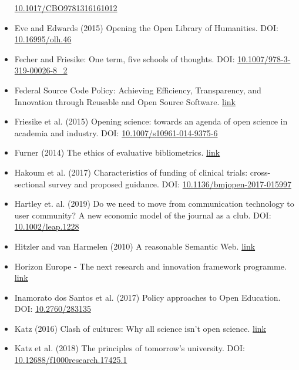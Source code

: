 \begin{itemize}
  \href{https://doi.org/10.1017/CBO9781316161012}{10.1017/CBO9781316161012}
\item
  Eve and Edwards (2015) Opening the Open Library of Humanities. DOI:
  \href{https://doi.org/10.16995/olh.46}{10.16995/olh.46}
\item
  Fecher and Friesike: One term, five schools of thoughts. DOI:
  \href{https://doi.org/10.1007/978-3-319-00026-8_2}{10.1007/978-3-319-00026-8\_2}
\item
  Federal Source Code Policy: Achieving Efficiency, Transparency, and
  Innovation through Reusable and Open Source Software.
  \href{https://sourcecode.cio.gov/}{link}
\item
  Friesike et al. (2015) Opening science: towards an agenda of open
  science in academia and industry. DOI:
  \href{https://doi.org/10.1007/s10961-014-9375-6}{10.1007/s10961-014-9375-6}
\item
  Furner (2014) The ethics of evaluative bibliometrics.
  \href{http://www.jonathanfurner.info/docs/furnerInPress-a.pdf}{link}
\item
  Hakoum et al. (2017) Characteristics of funding of clinical trials:
  cross-sectional survey and proposed guidance. DOI:
  \href{https://doi.org/10.1136/bmjopen-2017-015997}{10.1136/bmjopen-2017-015997}
\item
  Hartley et. al. (2019) Do we need to move from communication
  technology to user community? A new economic model of the journal as a
  club. DOI: \href{https://doi.org/10.1002/leap.1228}{10.1002/leap.1228}
\item
  Hitzler and van Harmelen (2010) A reasonable Semantic Web.
  \href{http://www.semantic-web-journal.net/content/reasonable-semantic-web}{link}
\item
  Horizon Europe - The next research and innovation framework programme.
  \href{https://ec.europa.eu/info/designing-next-research-and-innovation-framework-programme/what-shapes-next-framework-programme_en}{link}
\item
  Inamorato dos Santos et al. (2017) Policy approaches to Open
  Education. DOI: \href{https://doi.org/10.2760/283135}{10.2760/283135}
\item
  Katz (2016) Clash of cultures: Why all science isn't open science.
  \href{https://danielskatzblog.wordpress.com/2016/10/25/clash-of-cultures-why-all-science-isnt-open-science/}{link}
\item
  Katz et al. (2018) The principles of tomorrow's university. DOI:
  \href{https://doi.org/10.12688/f1000research.17425.1}{10.12688/f1000research.17425.1}

\end{itemize}
